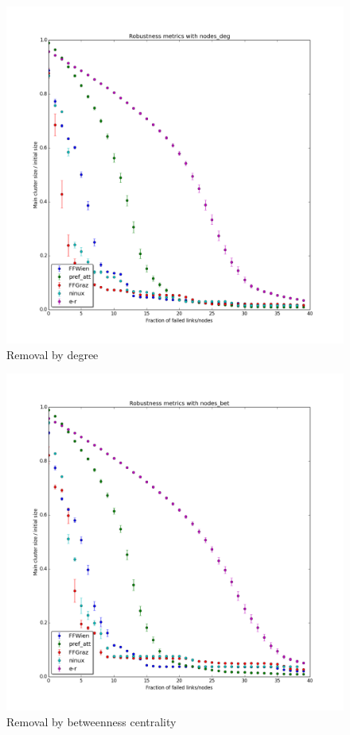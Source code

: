 \documentclass[oneside,openany]{memoir}
\begin{document}
\begin{figure}[htbp]
\centering
\includegraphics{./synthetic_topologies/results/20140618-1529/nodes_deg_robustness.png}
\caption{Removal by degree}
\end{figure}

\begin{figure}[htbp]
\centering
\includegraphics{./synthetic_topologies/results/20140618-1529/nodes_bet_robustness.png}
\caption{Removal by betweenness centrality}
\end{figure}
\end{document}
